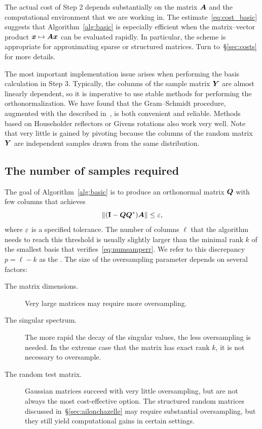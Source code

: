 \documentclass[final]{siamltex}
\newcounter{algorithm}[section]
\begin{document}
The actual cost of Step 2 depends substantially on the matrix $\bm{A}$ and the
computational environment that we are working in.
The estimate~\eqref{eq:cost_basic} suggests that Algorithm~\ref{alg:basic}
is especially efficient when the matrix--vector product $\bm{x} \mapsto \bm{A}\bm{x}$
can be evaluated rapidly.  In particular, the scheme is appropriate for
approximating sparse or structured matrices.  Turn to~\S\ref{sec:costs} for more details.

The most important implementation issue arises when performing the basis calculation
in Step 3.  Typically, the columns of the sample matrix $\bm{Y}$ are almost linearly
dependent, so it is imperative to use stable methods for performing
the orthonormalization.  We have found that the Gram--Schmidt procedure,
augmented with the  described in~\cite{bjorck94},
is both convenient and reliable.  Methods based on Householder reflectors or Givens
rotations also work very well.  Note that very little is gained by pivoting because
the columns of the random matrix $\bm{Y}$ are independent samples drawn from
the same distribution.


\subsection{The number of samples required}
\label{sec:howmuchoversampling}

The goal of Algorithm~\ref{alg:basic} is to produce an orthonormal matrix $\bm{Q}$
with few columns that achieves
\begin{equation} \label{eq:numsamperr}
\norm{ (\Id - \mtx{QQ}^\adj) \mtx{A} } \leq \eps,
\end{equation}
where $\varepsilon$ is a specified tolerance.  The number of columns $\ell$
that the algorithm needs to reach this threshold is usually slightly larger than
the minimal rank $k$ of the smallest basis that verifies~\eqref{eq:numsamperr}.
We refer to this discrepancy $p = \ell - k$ as the .
The size of the oversampling parameter depends on several factors:

\lsp

\begin{description}
\item[The matrix dimensions.] Very large matrices may require more oversampling.

\item[The singular spectrum.] The more rapid the decay of the singular values,
the less oversampling is needed.  In the extreme case that the matrix has exact
rank $k$, it is not necessary to oversample.

\item[The random test matrix.]  Gaussian matrices succeed with very little oversampling,
but are not always the most cost-effective option.
The structured random matrices discussed in~\S\ref{sec:ailonchazelle}
may require substantial oversampling, but they still yield computational
gains in certain settings.
\end{description}
\end{document}
